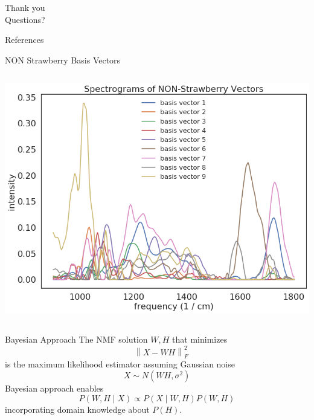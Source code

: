 \documentclass[aspectratio=169]{beamer}
\begin{document}

\begin{frame}[focus]
	Thank you \\
	Questions?
\end{frame}


\appendix

\begin{frame}{References}
	\nocite{*} %
	
	
\end{frame}


\begin{frame}{NON Strawberry Basis Vectors}

	\begin{columns}

			\includegraphics[width=\linewidth]{images/non_strawberry_basis_vectors.png}
	\end{columns}
\end{frame}


\begin{frame}{Bayesian Approach}
	The NMF solution $W, H$ that minimizes
	\begin{equation*}
	 \quad \left\lVert X - W H\right\rVert^2_F
	\end{equation*}
	is the maximum likelihood estimator assuming Gaussian noise
	\begin{equation*}
	X \sim N( W H, \sigma^2)
	\end{equation*}
	Bayesian approach enables 
	\begin{equation*}
	P(W, H \mid X) \propto  P(X \mid W, H ) P(W, H)
	\end{equation*}
	incorporating domain knowledge about $P(H) $.
\end{frame}
\end{document}
